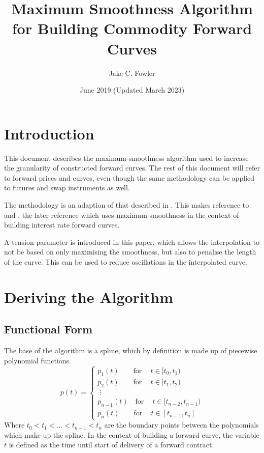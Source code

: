 \documentclass{article}
\title{Maximum Smoothness Algorithm for Building Commodity Forward Curves}
\author{Jake C. Fowler}
\date{June 2019 (Updated March 2023)}
\begin{document}
\newcommand{\+}[1]{\ensuremath{\mathbf{#1}}}

\maketitle

\section{Introduction}
This document describes the maximum-smoothness algorithm used to increase the granularity of constructed forward curves.
The rest of this document will refer to forward prices and curves, even though the same methodology can be applied to futures and swap instruments as well.

\bigskip
The methodology is an adaption of that described in \citep{Unknown}. 
This makes reference to \cite{Benth} and \cite{Lim}, the later reference which uses maximum smoothness
in the context of building interest rate forward curves.
\bigskip

A tension parameter is introduced in this paper, which allows the interpolation to not be
based on only maximising the smoothness, but also to penalise the length of the curve. This
can be used to reduce oscillations in the interpolated curve.

\section{Deriving the Algorithm}
\subsection{Functional Form}
The base of the algorithm is a spline, which by definition is made up of piecewise polynomial functions.
\begin{equation}
p(t) = 
\begin{cases}
    p_1(t)\qquad \text{for}\ \quad t \in [t_0, t_1) \\
    p_2(t)\qquad \text{for}\ \quad t \in [t_1, t_2) \\
    \;\vdots \\
    p_{n-1}(t)\quad \text{for}\ \quad t \in [t_{n-2}, t_{n-1}) \\
    p_n(t)\qquad \text{for}\ \quad t \in [t_{n-1}, t_n]
\end{cases}
\end{equation}
Where $t_0 < t_1 < \hdots < t_{n-1} < t_{n}$ are the boundary points between the polynomials which make up the spline.
In the context of building a forward curve, the variable $t$ is defined as
the time until start of delivery of a forward contract.
\end{document}

